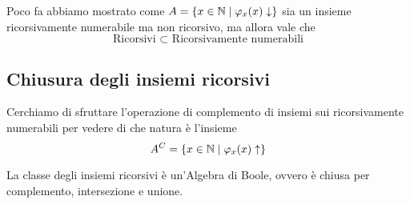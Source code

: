 Poco fa abbiamo mostrato come $A = \left\{x \in \mathbb{N} \mid \varphi_x (x) \downarrow\right\}$ sia un insieme ricorsivamente numerabile ma non ricorsivo, ma allora vale che
$$\text{Ricorsivi } \subset \text{ Ricorsivamente numerabili} $$

\subsection{Chiusura degli insiemi ricorsivi}

Cerchiamo di sfruttare l'operazione di complemento di insiemi sui ricorsivamente numerabili per vedere di che natura è l'insieme
$$ A^C = \left\{x \in \mathbb{N} \mid \varphi_x (x) \uparrow \right\}$$

\begin{theor}
	La classe degli insiemi ricorsivi è un'Algebra di Boole, ovvero è chiusa per complemento, intersezione e unione.
\end{theor}

